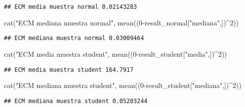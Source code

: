 \documentclass[
]{article}
\newenvironment{Shaded}{\begin{snugshade}}{\end{snugshade}}
\newcommand{\DecValTok}[1]{\textcolor[rgb]{0.00,0.00,0.81}{#1}}
\newcommand{\FunctionTok}[1]{\textcolor[rgb]{0.00,0.00,0.00}{#1}}
\newcommand{\NormalTok}[1]{#1}
\newcommand{\SpecialCharTok}[1]{\textcolor[rgb]{0.00,0.00,0.00}{#1}}
\newcommand{\StringTok}[1]{\textcolor[rgb]{0.31,0.60,0.02}{#1}}
\begin{document}
\begin{verbatim}
## ECM media muestra normal 0.02143283
\end{verbatim}

\begin{Shaded}
\begin{Highlighting}[]
\FunctionTok{cat}\NormalTok{(}\StringTok{"ECM mediana muestra normal"}\NormalTok{, }\FunctionTok{mean}\NormalTok{((}\DecValTok{0}\SpecialCharTok{{-}}\NormalTok{result\_normal[}\StringTok{"mediana"}\NormalTok{,])}\SpecialCharTok{\^{}}\DecValTok{2}\NormalTok{))}
\end{Highlighting}
\end{Shaded}

\begin{verbatim}
## ECM mediana muestra normal 0.03009464
\end{verbatim}

\begin{Shaded}
\begin{Highlighting}[]
\FunctionTok{cat}\NormalTok{(}\StringTok{"ECM media muestra student"}\NormalTok{, }\FunctionTok{mean}\NormalTok{((}\DecValTok{0}\SpecialCharTok{{-}}\NormalTok{result\_student[}\StringTok{"media"}\NormalTok{,])}\SpecialCharTok{\^{}}\DecValTok{2}\NormalTok{))}
\end{Highlighting}
\end{Shaded}

\begin{verbatim}
## ECM media muestra student 164.7917
\end{verbatim}

\begin{Shaded}
\begin{Highlighting}[]
\FunctionTok{cat}\NormalTok{(}\StringTok{"ECM mediana muestra student"}\NormalTok{, }\FunctionTok{mean}\NormalTok{((}\DecValTok{0}\SpecialCharTok{{-}}\NormalTok{result\_student[}\StringTok{"mediana"}\NormalTok{,])}\SpecialCharTok{\^{}}\DecValTok{2}\NormalTok{))}
\end{Highlighting}
\end{Shaded}

\begin{verbatim}
## ECM mediana muestra student 0.05203244
\end{verbatim}
\end{document}
